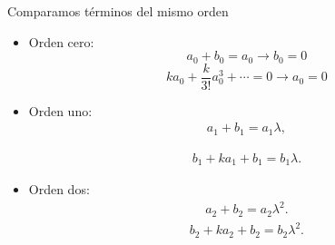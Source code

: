 \documentclass[11pt]{beamer}
\theoremstyle{definition}
\begin{document}
\begin{frame}
Comparamos t\'erminos del mismo orden
\begin{itemize}
\item Orden cero:
\begin{equation}
a_{0}+b_{0}=a_{0} \rightarrow b_{0}=0
\end{equation}
\begin{equation}
k a_{0}+\frac{k}{3!}a_{0}^{3}+\cdots=0  \rightarrow a_{0}=0
\end{equation}
\item  Orden uno:
\begin{eqnarray}
a_{1}+b_{1}=a_{1}\lambda ,
\end{eqnarray}

\begin{eqnarray}
b_{1}+ka_{1}+b_{1}=b_{1}\lambda .
\end{eqnarray}
\item Orden dos:
\begin{eqnarray}
a_{2}+b_{2}=a_{2}\lambda^{2}.
\label{segundos_coeficientes_a}
\end{eqnarray}
\begin{eqnarray}
b_{2}+ka_{2}+b_{2}=b_{2}\lambda^{2}.
\label{segundos_coeficientes_b}
\end{eqnarray}
\end{itemize}

\end{frame}
\end{document}
